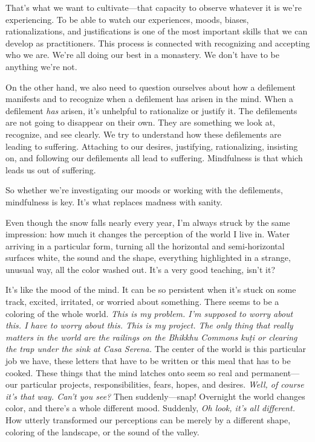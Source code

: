 That's what we want to cultivate---that capacity to observe whatever it 
is we're experiencing. To be able to watch our experiences, moods, 
biases, rationalizations, and justifications is one of the most 
important skills that we can develop as practitioners. This process is 
connected with recognizing and accepting who we are. We're all doing 
our best in a monastery. We don't have to be anything we're not.

On the other hand, we also need to question ourselves about how a 
defilement manifests and to recognize when a defilement has arisen in 
the mind. When a defilement \emph{has} arisen, it's unhelpful to 
rationalize or justify it. The defilements are not going to disappear 
on their own. They are something we look at, recognize, and see 
clearly. We try to understand how these defilements are leading to 
suffering. Attaching to our desires, justifying, rationalizing, 
insisting on, and following our defilements all lead to suffering. 
Mindfulness is that which leads us out of suffering.

So whether we're investigating our moods or working with the 
defilements, mindfulness is key. It's what replaces madness with sanity.


Even though the snow falls nearly every year, I'm always struck by the 
same impression: how much it changes the perception of the world I live 
in. Water arriving in a particular form, turning all the horizontal and 
semi-horizontal surfaces white, the sound and the shape, everything 
highlighted in a strange, unusual way, all the color washed out. It's a 
very good teaching, isn't it?

It's like the mood of the mind. It can be so persistent when it's stuck 
on some track, excited, irritated, or worried about something. There 
seems to be a coloring of the whole world. \emph{This is my problem. 
I'm supposed to worry about this. I have to worry about this. This is 
my project. The only thing that really matters in the world are the 
railings on the Bhikkhu Commons kuṭi or clearing the trap under the 
sink at Casa Serena.} The center of the world is this particular job we 
have, these letters that have to be written or this meal that has to be 
cooked. These things that the mind latches onto seem so real and 
permanent---our particular projects, responsibilities, fears, hopes, 
and desires. \emph{Well, of course it's that way. Can't you see?} Then 
suddenly---snap! Overnight the world changes color, and there's a whole 
different mood. Suddenly, \emph{Oh look, it's all different.} How 
utterly transformed our perceptions can be merely by a different shape, 
coloring of the landscape, or the sound of the valley.

